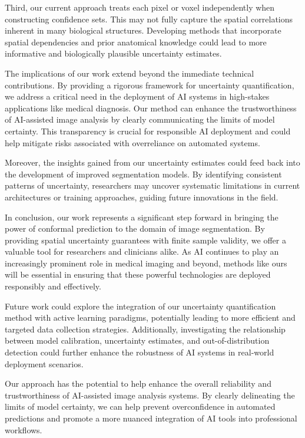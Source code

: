 Third, our current approach treats each pixel or voxel independently when constructing confidence sets. This may not fully capture the spatial correlations inherent in many biological structures. Developing methods that incorporate spatial dependencies and prior anatomical knowledge could lead to more informative and biologically plausible uncertainty estimates.

The implications of our work extend beyond the immediate technical contributions. By providing a rigorous framework for uncertainty quantification, we address a critical need in the deployment of AI systems in high-stakes applications like medical diagnosis. Our method can enhance the trustworthiness of AI-assisted image analysis by clearly communicating the limits of model certainty. This transparency is crucial for responsible AI deployment and could help mitigate risks associated with overreliance on automated systems.

Moreover, the insights gained from our uncertainty estimates could feed back into the development of improved segmentation models. By identifying consistent patterns of uncertainty, researchers may uncover systematic limitations in current architectures or training approaches, guiding future innovations in the field.

In conclusion, our work represents a significant step forward in bringing the power of conformal prediction to the domain of image segmentation. By providing spatial uncertainty guarantees with finite sample validity, we offer a valuable tool for researchers and clinicians alike. As AI continues to play an increasingly prominent role in medical imaging and beyond, methods like ours will be essential in ensuring that these powerful technologies are deployed responsibly and effectively.

Future work could explore the integration of our uncertainty quantification method with active learning paradigms, potentially leading to more efficient and targeted data collection strategies. Additionally, investigating the relationship between model calibration, uncertainty estimates, and out-of-distribution detection could further enhance the robustness of AI systems in real-world deployment scenarios.

Our approach has the potential to help enhance the overall reliability and trustworthiness of AI-assisted image analysis systems. By clearly delineating the limits of model certainty, we can help prevent overconfidence in automated predictions and promote a more nuanced integration of AI tools into professional workflows.